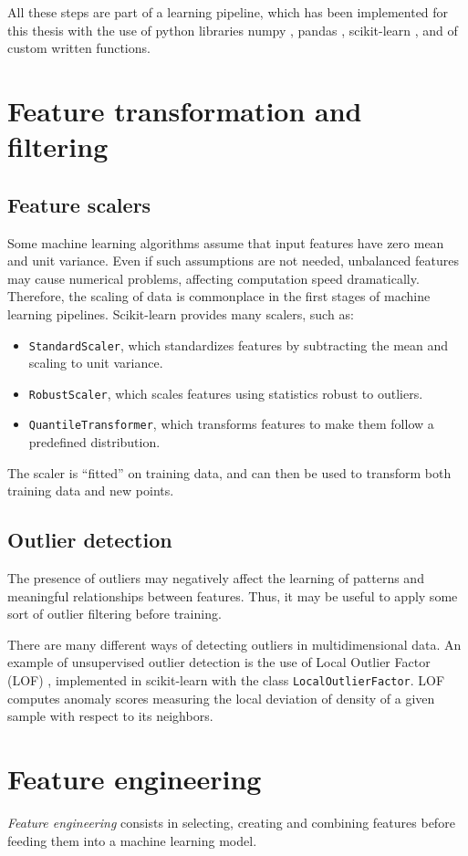 \documentclass[12pt]{report}
\begin{document}
All these steps are part of a learning pipeline, which has been implemented for this thesis with the use of python libraries numpy \cite{numpy}, pandas \cite{pandas}, scikit-learn \cite{sklearn}, and of custom written functions.

\section{Feature transformation and filtering}
\subsection*{Feature scalers}
Some machine learning algorithms assume that input features have zero mean and unit variance. Even if such assumptions are not needed, unbalanced features may cause numerical problems, affecting computation speed dramatically. Therefore, the scaling of data is commonplace in the first stages of machine learning pipelines. Scikit-learn provides many scalers, such as:
\begin{itemize}
\item \texttt{StandardScaler}, which standardizes features by subtracting the mean and scaling to unit variance.
\item \texttt{RobustScaler}, which scales features using statistics robust to outliers.
\item \texttt{QuantileTransformer}, which transforms features to make them follow a predefined distribution.
\end{itemize}
The scaler is ``fitted'' on training data, and can then be used to transform both training data and new points.

\subsection*{Outlier detection}
The presence of outliers may negatively affect the learning of patterns and meaningful relationships between features. Thus, it may be useful to apply some sort of outlier filtering before training.

There are many different ways of detecting outliers in multidimensional data. An example of unsupervised outlier detection is the use of Local Outlier Factor (LOF) \cite{breunig00}, implemented in scikit-learn with the class \texttt{LocalOutlierFactor}. LOF computes anomaly scores measuring the local deviation of density of a given sample with respect to its neighbors.

\section{Feature engineering}
\textit{Feature engineering} consists in selecting, creating and combining features before feeding them into a machine learning model.
\end{document}
